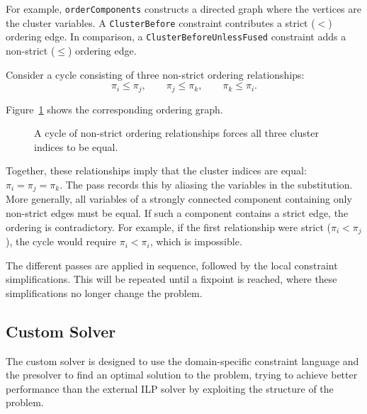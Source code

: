 For example, \texttt{orderComponents} constructs a directed graph where the vertices are the cluster variables.
A \texttt{ClusterBefore} constraint contributes a strict ($<$) ordering edge.
In comparison, a \texttt{ClusterBeforeUnlessFused} constraint adds a non-strict ($\leq$) ordering edge.

Consider a cycle consisting of three non-strict ordering relationships:
\[
    \pi_i \leq \pi_j, \qquad
    \pi_j \leq \pi_k, \qquad
    \pi_k \leq \pi_i.
\]

Figure~\ref{fig:ordering-cycle} shows the corresponding ordering graph.
\begin{figure}[htbp]
    \centering
    \caption{A cycle of non-strict ordering relationships forces all three cluster indices to be equal.}
    \label{fig:ordering-cycle}
\end{figure}

Together, these relationships imply that the cluster indices are equal: $\pi_i = \pi_j = \pi_k$.
The pass records this by aliasing the variables in the substitution.
More generally, all variables of a strongly connected component containing only non-strict edges must be equal.
If such a component contains a strict edge, the ordering is contradictory.
For example, if the first relationship were strict ($\pi_i < \pi_j$), the cycle would require $\pi_i < \pi_i$, which is impossible.

The different passes are applied in sequence, followed by the local constraint simplifications.
This will be repeated until a fixpoint is reached, where these simplifications no longer change the problem.

\subsection{Custom Solver}
The custom solver is designed to use the domain-specific constraint language and the presolver to find an optimal solution to the problem, trying to achieve better performance than the external ILP solver by exploiting the structure of the problem.

